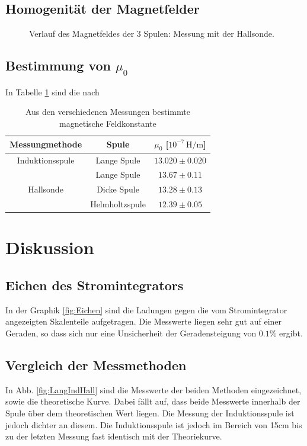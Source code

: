 \documentclass[12pt,a4paper,titlepage,headinclude,bibtotoc]{scrartcl}
\begin{document}
\subsection{Homogenität der Magnetfelder}
\begin{figure}[!htb]
	\centering
	
	\caption{Verlauf des Magnetfeldes der 3 Spulen: Messung mit der Hallsonde.}
	\label{fig:Homogen}
\end{figure}

\subsection{Bestimmung von $\mu_0$}
In Tabelle \ref{tab:mu} sind die nach 
\begin{table}[!htb]
	\centering
	\begin{tabular}{|c|c|c|}
	\hline
	Messungmethode & Spule & $\mu_0$ [$10^{-7}\,\si{\henry\per\meter}$]\\
	\hline
	\hline
	Induktionsspule & Lange Spule & $13.020 \pm 0.020$\\
	\hline
	          & Lange Spule & $13.67 \pm 0.11$ \\
	Hallsonde & Dicke Spule & $13.28 \pm 0.13$ \\
	          & Helmholtzspule & $12.39 \pm 0.05$ \\
	\hline	
	\end{tabular}
	\caption{Aus den verschiedenen Messungen bestimmte magnetische Feldkonstante}
	\label{tab:mu}
\end{table}


\section{Diskussion}
\label{sec:diskussion}
\subsection{Eichen des Stromintegrators}
In der Graphik \ref{fig:Eichen} sind die Ladungen gegen die vom Stromintegrator angezeigten Skalenteile aufgetragen.
Die Messwerte liegen sehr gut auf einer Geraden, so dass sich nur eine Unsicherheit der Geradensteigung von $0.1\%$ ergibt.

\subsection{Vergleich der Messmethoden}
In Abb. \ref{fig:LangIndHall} sind die Messwerte der beiden Methoden eingezeichnet, sowie die theoretische Kurve.
Dabei fällt auf, dass beide Messwerte innerhalb der Spule über dem theoretischen Wert liegen.
Die Messung der Induktionsspule ist jedoch dichter an diesem.
Die Induktionsspule ist jedoch im Bereich von 15cm bis zu der letzten Messung fast identisch mit der Theoriekurve.
\end{document}
